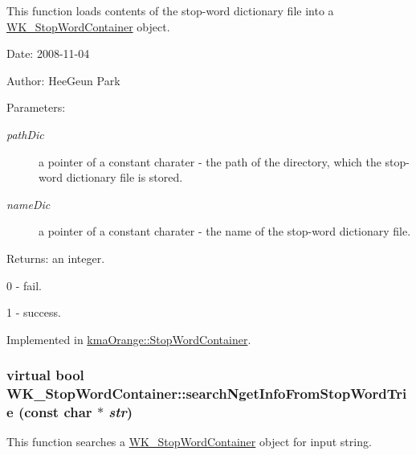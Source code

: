 This function loads contents of the stop-word dictionary file into a \hyperlink{classWK__StopWordContainer}{WK\_\-StopWordContainer} object. 

\begin{Desc}
\item[Date:]2008-11-04 \end{Desc}
\begin{Desc}
\item[Author:]HeeGeun Park \end{Desc}
\begin{Desc}
\item[Parameters:]
\begin{description}
\item[{\em pathDic}]a pointer of a constant charater - the path of the directory, which the stop-word dictionary file is stored. \item[{\em nameDic}]a pointer of a constant charater - the name of the stop-word dictionary file. \end{description}
\end{Desc}
\begin{Desc}
\item[Returns:]an integer.\par
 0 - fail.\par
 1 - success. \end{Desc}


Implemented in \hyperlink{classkmaOrange_1_1StopWordContainer_ab4a54069abd335d64dd34d6f194b1a2}{kmaOrange::StopWordContainer}.\hypertarget{classWK__StopWordContainer_03819e17b2d47d76452505b9cf03c685}{
\subsubsection[{searchNgetInfoFromStopWordTrie}]{\setlength{\rightskip}{0pt plus 5cm}virtual bool WK\_\-StopWordContainer::searchNgetInfoFromStopWordTrie (const char $\ast$ {\em str})}}
\label{classWK__StopWordContainer_03819e17b2d47d76452505b9cf03c685}


This function searches a \hyperlink{classWK__StopWordContainer}{WK\_\-StopWordContainer} object for input string. 


